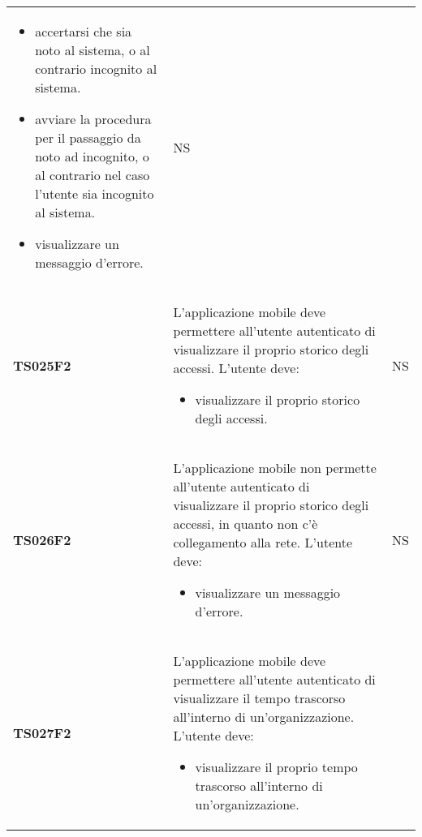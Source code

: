 \documentclass[../piano-di-qualifica.tex]{subfiles}
\begin{document}
\begin{centering}
\begin{longtable}[H]{>{\centering\bfseries}m{3cm} >{}p{10cm} >{\centering\arraybackslash}m{3cm}}
\begin{itemize}
      \item accertarsi che sia noto al sistema, o al contrario incognito al sistema.
      \item avviare la procedura per il passaggio da noto ad incognito, o al contrario nel caso l'utente sia incognito al sistema.
      \item visualizzare un messaggio d'errore.
    \end{itemize}
                       & NS                                                                                                                                                                                                                                                               \\
    TS025F2            & L'applicazione mobile deve permettere all'utente autenticato di visualizzare il proprio storico degli accessi. \newline
    L'utente deve:
    \begin{itemize}
      \item visualizzare il proprio storico degli accessi.
    \end{itemize}
                       & NS                                                                                                                                                                                                                                                               \\
    TS026F2            & L'applicazione mobile non permette all'utente autenticato di visualizzare il proprio storico degli accessi, in quanto non c'è collegamento alla rete. \newline
    L'utente deve:
    \begin{itemize}
      \item visualizzare un messaggio d'errore.
    \end{itemize}
                       & NS                                                                                                                                                                                                                                                               \\
    TS027F2            & L'applicazione mobile deve permettere all'utente autenticato di visualizzare il tempo trascorso all'interno di un'organizzazione. \newline
    L'utente deve:
    \begin{itemize}
      \item visualizzare il proprio tempo trascorso all'interno di un'organizzazione.

\end{itemize}
\end{longtable}
\end{centering}
\end{document}
